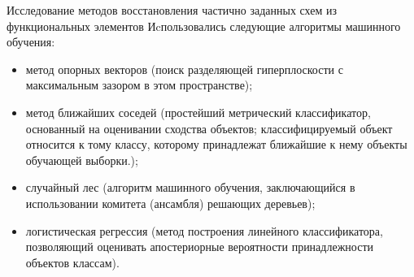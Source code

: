 \documentclass[serif,utf8]{beamer}
\newtheorem{mydef}{Определение}
\begin{document}



\begin{frame}{Исследование методов восстановления частично заданных схем из функциональных элементов} 
Иcпользовались следующие алгоритмы машинного обучения:
\small{\begin{itemize}
\item метод опорных векторов (поиск разделяющей гиперплоскости с максимальным зазором в этом пространстве);
\item метод ближайших соседей (простейший метрический классификатор, основанный на оценивании сходства объектов; классифицируемый объект относится к тому классу, которому принадлежат ближайшие к нему объекты обучающей выборки.);
\item случайный лес (алгоритм машинного обучения, заключающийся в использовании комитета (ансамбля) решающих деревьев);
\item логистическая регрессия (метод построения линейного классификатора, позволяющий оценивать апостериорные вероятности принадлежности объектов классам).
\end{itemize}
}
\end{frame}
\end{document}
